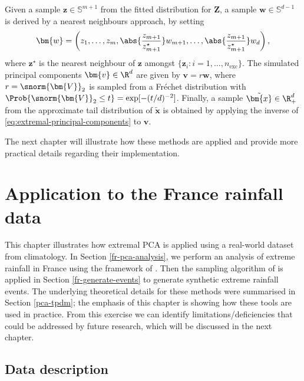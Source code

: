 \documentclass[en-GB, a4paper, nobind]{templates/bathreport}
\begin{document}
Given a sample \(\bm{z}\in\mathbb{S}^{m+1}\) from the fitted distribution for \(\bm{Z}\), a sample \(\bm{w}\in\mathbb{S}^{d-1}\) is derived by a nearest neighbours approach, by setting
\begin{equation*}
\bm{w} = \left(z_1,\ldots,z_m,\abs{\frac{z_{m+1}}{z_{m+1}^\star}}w_{m+1},\ldots,\abs{\frac{z_{m+1}}{z_{m+1}^\star}}w_{d}\right),
\end{equation*}
where \(\bm{z}^\star\) is the nearest neighbour of \(\bm{z}\) amongst \(\{\bm{z}_i:i=1,\ldots,n_{\text{exc}}\}\). The simulated principal components \(\bm{v}\in\R^d\) are given by \(\bm{v}=r\bm{w}\), where \(r=\snorm{\bm{V}}_2\) is sampled from a Fréchet distribution with \(\Prob{\snorm{\bm{V}}_2\leq t}=\exp[-(t/d)^{-2}]\). Finally, a sample \(\tilde{\bm{x}}\in\R_+^d\) from the approximate tail distribution of \(\tilde{\bm{x}}\) is obtained by applying the inverse of \eqref{eq:extremal-principal-components} to \(\bm{v}\).

The next chapter will illustrate how these methods are applied and provide more practical details regarding their implementation.

\hypertarget{application-fr-rain}{%
\chapter{Application to the France rainfall data}\label{application-fr-rain}}

\minitoc

This chapter illustrates how extremal PCA is applied using a real-world dataset from climatology. In Section \ref{fr-pca-analysis}, we perform an analysis of extreme rainfall in France using the framework of \textcite{cooleyDecompositionsDependenceHighdimensional2019}. Then the sampling algorithm of \textcite{rohrbeckSimulatingFloodEvent2021} is applied in Section \ref{fr-generate-events} to generate synthetic extreme rainfall events. The underlying theoretical details for these methods were summarised in Section \ref{pca-tpdm}; the emphasis of this chapter is showing how these tools are used in practice. From this exercise we can identify limitations/deficiencies that could be addressed by future research, which will be discussed in the next chapter.

\hypertarget{data-description}{%
\section{Data description}\label{data-description}}
\end{document}
